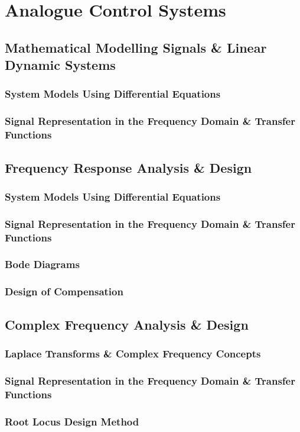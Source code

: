 \vspace{10cm}
\chapter{Analogue Control Systems}

\newpage
\section{Mathematical Modelling Signals \& Linear Dynamic Systems}
\subsection{System Models Using Differential Equations}
\subsection{Signal Representation in the Frequency Domain \& Transfer Functions}

\newpage
\section{Frequency Response Analysis \& Design}
\subsection{System Models Using Differential Equations}
\subsection{Signal Representation in the Frequency Domain \& Transfer Functions}
\subsection{Bode Diagrams}
\subsection{Design of Compensation}

\newpage
\section{Complex Frequency Analysis \& Design}
\subsection{Laplace Transforms \& Complex Frequency Concepts}
\subsection{Signal Representation in the Frequency Domain \& Transfer Functions}
\subsection{Root Locus Design Method}

